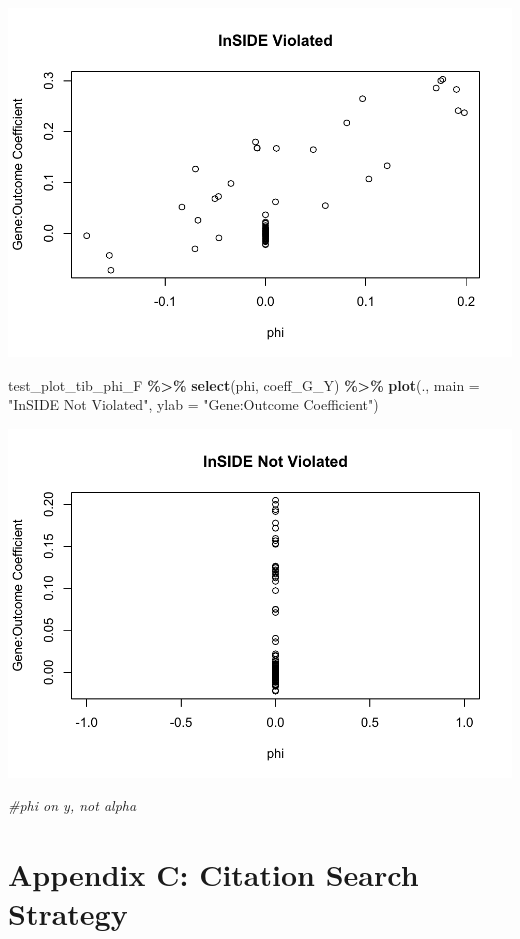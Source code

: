\documentclass[
]{article}
\newenvironment{Shaded}{\begin{snugshade}}{\end{snugshade}}
\newcommand{\AttributeTok}[1]{\textcolor[rgb]{0.13,0.29,0.53}{#1}}
\newcommand{\CommentTok}[1]{\textcolor[rgb]{0.56,0.35,0.01}{\textit{#1}}}
\newcommand{\FunctionTok}[1]{\textcolor[rgb]{0.13,0.29,0.53}{\textbf{#1}}}
\newcommand{\NormalTok}[1]{#1}
\newcommand{\SpecialCharTok}[1]{\textcolor[rgb]{0.81,0.36,0.00}{\textbf{#1}}}
\newcommand{\StringTok}[1]{\textcolor[rgb]{0.31,0.60,0.02}{#1}}
\begin{document}
\includegraphics{9_Test_Appendices_files/figure-latex/test-plot-phi-2-1.pdf}

\begin{Shaded}
\begin{Highlighting}[]
\NormalTok{ test\_plot\_tib\_phi\_F }\SpecialCharTok{\%\textgreater{}\%}
   \FunctionTok{select}\NormalTok{(phi, coeff\_G\_Y) }\SpecialCharTok{\%\textgreater{}\%}
   \FunctionTok{plot}\NormalTok{(.,}
        \AttributeTok{main =} \StringTok{"InSIDE Not Violated"}\NormalTok{,}
        \AttributeTok{ylab =} \StringTok{"Gene:Outcome Coefficient"}\NormalTok{)}
\end{Highlighting}
\end{Shaded}

\includegraphics{9_Test_Appendices_files/figure-latex/test-plot-phi-2-2.pdf}

\begin{Shaded}
\begin{Highlighting}[]
\CommentTok{\#phi on y, not alpha}
\end{Highlighting}
\end{Shaded}

\newpage

\section{Appendix C: Citation Search Strategy}\label{appendix-c-citation-search-strategy}
\end{document}

